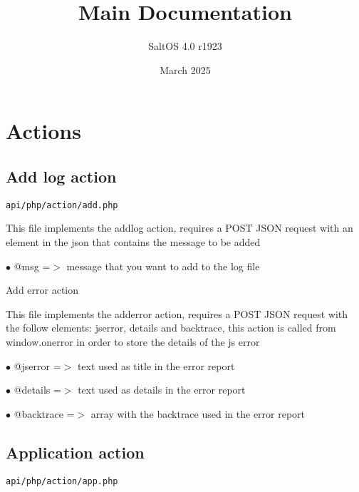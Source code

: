 \documentclass[a4paper]{article}
\title{Main Documentation}
\author{SaltOS 4.0 r1923}
\begin{document}
\date{March 2025}
\maketitle
\clearpage

\tableofcontents
\clearpage


\hypertarget{toc1}{}
\section{Actions}

\hypertarget{toc2}{}
\subsection{Add log action}

\begin{lstlisting}
api/php/action/add.php
\end{lstlisting}

This file implements the addlog action, requires a POST JSON request
with an element in the json that contains the message to be added

\begin{compactitem}
\item[\color{myblue}$\bullet$] @msg =$>$ message that you want to add to the log file
\end{compactitem}

Add error action

This file implements the adderror action, requires a POST JSON request
with the follow elements: jserror, details and backtrace, this action
is called from window.onerror in order to store the details of the js
error

\begin{compactitem}
\item[\color{myblue}$\bullet$] @jserror   =$>$ text used as title in the error report
\item[\color{myblue}$\bullet$] @details   =$>$ text used as details in the error report
\item[\color{myblue}$\bullet$] @backtrace =$>$ array with the backtrace used in the error report
\end{compactitem}

\hypertarget{toc3}{}
\subsection{Application action}

\begin{lstlisting}
api/php/action/app.php
\end{lstlisting}
\end{document}
